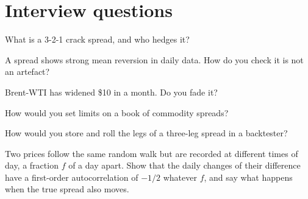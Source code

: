 \section{Interview questions}

\begin{interviewq}\label{iq:s2:commodity-spreads:1}
What is a 3-2-1 crack spread, and who hedges it?
\end{interviewq}

\begin{interviewq}\label{iq:s2:commodity-spreads:2}
A spread shows strong mean reversion in daily data. How do you check it is not an artefact?
\end{interviewq}

\begin{interviewq}\label{iq:s2:commodity-spreads:3}
Brent-WTI has widened \$10 in a month. Do you fade it?
\end{interviewq}

\begin{interviewq}\label{iq:s2:commodity-spreads:4}
How would you set limits on a book of commodity spreads?
\end{interviewq}

\begin{interviewq}\label{iq:s2:commodity-spreads:5}
How would you store and roll the legs of a three-leg spread in a backtester?
\end{interviewq}

\begin{interviewq}\label{iq:s2:commodity-spreads:6}
Two prices follow the same random walk but are recorded at different times of day, a fraction $f$ of a day apart. Show that the daily changes of
their difference have a first-order autocorrelation of $-1/2$ whatever $f$, and say what happens when the true spread also moves.
\end{interviewq}
